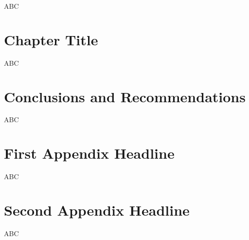 \documentclass[12pt]{report}
\begin{document}
\begin{mainf}
ABC

\clearpage




\chapter{Chapter Title}

ABC

\clearpage




\chapter{Conclusions and Recommendations}

ABC

\clearpage






\end{mainf}



\titleformat{\chapter}[hang]{\large\raggedright\bfseries}{\thechapter}{0 pt}{}
\titlespacing*{\chapter}{0pt}{-25 pt}{6 pt} %
\renewcommand\bibname{References}
{}
\setlength{\bibsep}{0pt}




\clearpage

\appendix
\multappendices %

\chapter{First Appendix Headline}

ABC

\clearpage

\chapter{Second Appendix Headline}

ABC

\clearpage
\end{document}
